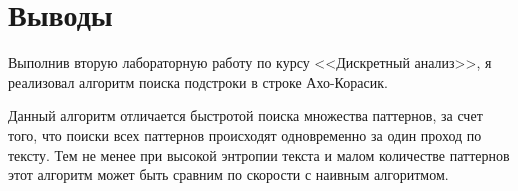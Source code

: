 \section{Выводы}
Выполнив вторую лабораторную работу по курсу <<Дискретный анализ>>, я реализовал алгоритм поиска подстроки в строке Ахо-Корасик.

Данный алгоритм отличается быстротой поиска множества паттернов, за счет того, что поиски всех паттернов происходят одновременно за один проход по тексту. Тем не менее при высокой энтропии текста и малом количестве паттернов этот алгоритм может быть сравним по скорости с наивным алгоритмом.
\pagebreak

